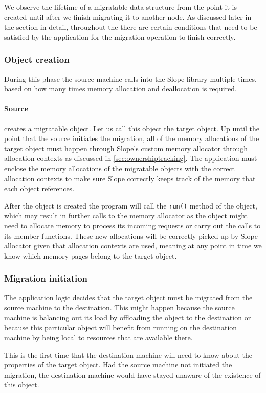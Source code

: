 We observe the lifetime of a migratable data structure from the point it is
created until after we finish migrating it to another node. As discussed
later in the section in detail, throughout the
there are certain conditions that need to be satisfied by the application
for the migration operation to finish correctly.

\subsubsection{Object creation}
During this phase the source machine calls into the Slope library multiple
times, based on how many times memory allocation and deallocation is required.

\paragraph{Source} creates a migratable object. Let us call this object
the target object. Up until the point that
the source initiates the migration, all of the memory allocations of the target object
must happen through
Slope's custom memory allocator through allocation contexts as discussed in
\autoref{sec:ownershiptracking}.
The application must enclose the memory allocations of the migratable objects
with the correct allocation contexts to make sure Slope correctly keeps track of the
memory that each object references.

After the object is created the program will call the \texttt{run()} method
of the object, which may result in further calls to the memory allocator as
the object might need to allocate memory to process its incoming requests or
carry out the calls to its member functions. These new allocations will be
correctly picked up by Slope allocator given that allocation contexts are used,
meaning at any point in time we know which memory pages belong to the target object.

\subsubsection{Migration initiation}
The application logic decides that the target object must be migrated from the
source machine to the destination. This might happen because the source machine
is balancing out its load by offloading the object to the destination or because
this particular object will benefit from running on the destination machine
by being local to resources that are available there.

This is the first time that the destination
machine will need to know about the properties of the target object. Had the
source machine not initiated the migration, the destination machine would have
stayed unaware of the existence of this object.


